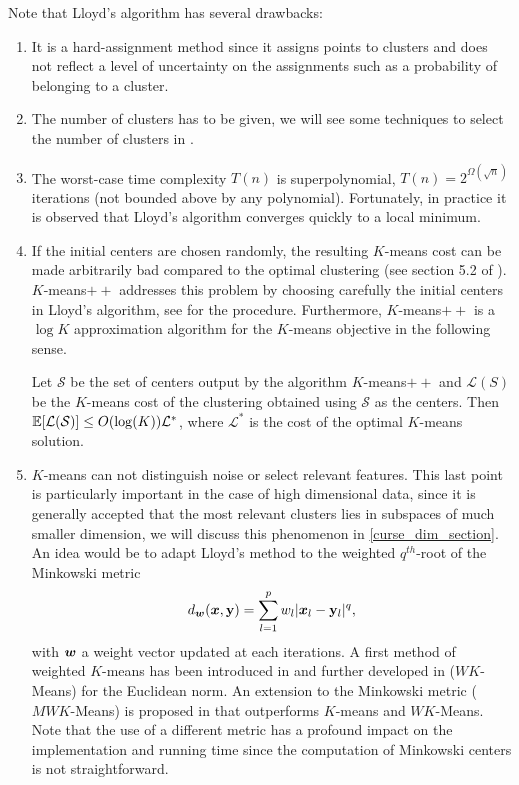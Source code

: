  Note that Lloyd's algorithm has several drawbacks: 
\begin{enumerate}
\item It is a hard-assignment method since it assigns points to clusters and does not reflect a level of uncertainty on the assignments such as a probability of belonging to a cluster.
 \item The number of clusters has to be given, we will see some techniques to select the number of clusters in .
 \item The worst-case time complexity $T(n)$ is superpolynomial, $T(n)=2^{\Omega(\sqrt{n})}$ iterations \citep{kmeans_slow_arthur_2016} (not bounded above by any polynomial). Fortunately, in practice it is observed that Lloyd's algorithm converges quickly to a local minimum.
 \item If the initial centers are chosen randomly, the resulting $K$-means cost can be made arbitrarily bad compared to the optimal clustering (see section 5.2 of \citep{hennig2015handbook}). $K$-means$++$ \citep{Arthur:2007:KAC:1283383.1283494} addresses this problem by choosing carefully the initial centers in Lloyd's algorithm, see  for the procedure. Furthermore, $K$-means$++$ is a $\log K$ approximation algorithm for the $K$-means objective in the following sense.
\begin{theorem}{\citep{Arthur:2007:KAC:1283383.1283494}}
\label{kmeans++_theo}
Let $\mathcal{S}$ be the set of centers output by the algorithm $K$-means$++$ and $\mathcal{L}(S)$ be the $K$-means cost of the clustering obtained using $\mathcal{S}$ as the centers. Then ${\mathbb E}[\mathcal{L(S)}]\leq O(\log(K))\mathcal{L}^*$, where $\mathcal{L}^*$ is the cost of the optimal $K$-means solution. 
\end{theorem}
\item $K$-means can not distinguish noise or select relevant features. This last point is particularly important in the case of high dimensional data, since it is generally accepted that the most relevant clusters lies in subspaces of much smaller dimension, we will discuss this phenomenon in \cref{curse_dim_section}. An idea would be to adapt Lloyd's method to the weighted $q^{th}$-root of the Minkowski metric
\begin{equation}
  d_{\boldsymbol w}(\boldsymbol x,\mathbf y) = \sum_{l=1}^p w_l|\boldsymbol x_l - \mathbf y_l|^q,
\end{equation}
with $\boldsymbol w$ a weight vector updated at each iterations. A first method of weighted $K$-means has been introduced in \citep{makarenkov2001optimal} and further developed in \citep{Huang_mink_kmeans} ($WK$-Means) for the Euclidean norm. An extension to the Minkowski metric ($MWK$-Means) is proposed in \citep{CordeirodeAmorim:2012:MMF:2051369.2051484} that outperforms $K$-means and $WK$-Means. Note that the use of a different metric has a profound impact on the implementation and running time since the computation of Minkowski centers is not straightforward.
\end{enumerate}
